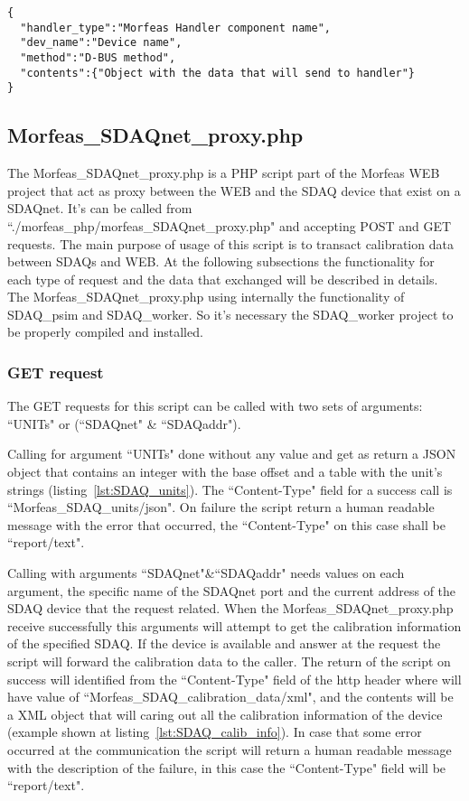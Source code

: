 \begin{lstlisting}[frame=single,caption=Structure of contents for POST request for Morfeas\_dbus\_proxy.php,label=lst:dbus_proxy]
{
  "handler_type":"Morfeas Handler component name",
  "dev_name":"Device name",
  "method":"D-BUS method",
  "contents":{"Object with the data that will send to handler"}
}
\end{lstlisting}

\subsection{Morfeas\_SDAQnet\_proxy.php}
The Morfeas\_SDAQnet\_proxy.php is a PHP script part of the Morfeas WEB project that act as proxy between the WEB and the SDAQ device that exist on a SDAQnet.
It's can be called from ``./morfeas\_php/morfeas\_SDAQnet\_proxy.php" and accepting POST and GET requests.
The main purpose of usage of this script is to transact calibration data between SDAQs and WEB.
At the following subsections the functionality for each type of request and the data that exchanged will be described in details.\\

The Morfeas\_SDAQnet\_proxy.php using internally the functionality of SDAQ\_psim and SDAQ\_worker.
So it's necessary the SDAQ\_worker project to be properly compiled and installed.

\subsubsection{GET request}
The GET requests for this script can be called with two sets of arguments: ``UNITs" or (``SDAQnet" \& ``SDAQaddr").

Calling for argument ``UNITs" done without any value and get as return a JSON object that contains an integer with the base offset and
a table with the unit's strings (listing~\ref{lst:SDAQ_units}). The ``Content-Type" field for a success call is ``Morfeas\_SDAQ\_units/json".
On failure the script return a human readable message with the error that occurred, the ``Content-Type" on this case shall be ``report/text".

Calling with arguments ``SDAQnet"\&``SDAQaddr" needs values on each argument, the specific name of the SDAQnet port and the current address of the SDAQ device that the request related.
When the Morfeas\_SDAQnet\_proxy.php receive successfully this arguments will attempt to get the calibration information of the specified SDAQ.
If the device is available and answer at the request the script will forward the calibration data to the caller.
The return of the script on success will identified from the ``Content-Type" field of the http header where will have value of ``Morfeas\_SDAQ\_calibration\_data/xml",
and the contents will be a XML object that will caring out all the calibration information of the device (example shown at listing~\ref{lst:SDAQ_calib_info}).
In case that some error occurred at the communication the script will return a human readable message with the description of the failure,
in this case the ``Content-Type" field will be ``report/text".

